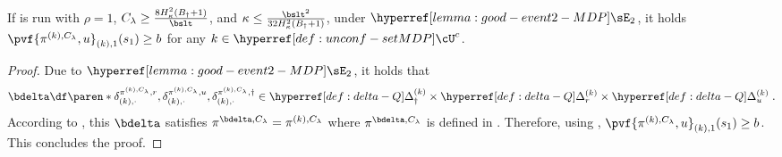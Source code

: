 \begin{lemma}
If  is run with $\rho = 1$, $C_\lambda \geq \frac{8H_\kappa^2 (B_\dagger + 1)}{\bslt}$, and $\kappa \leq \frac{\bslt^2}{32H_\kappa^2 (B_\dagger + 1)}$,
under $\confevent$, 
it holds $\pvf{\pi^{(k), C_\lambda}, u}_{(k), 1}(s_1) \geq b$ for any $k \in \unconfMDP^c$.
\end{lemma}
\begin{proof}
Due to $\confevent$, it holds that
$$
\bdelta \df \paren*{\delta^{\pi^{(k), C_\lambda}, r}_{(k), \cdot},
\delta^{\pi^{(k), C_\lambda}, u}_{(k), \cdot}, 
\delta^{\pi^{(k), C_\lambda}, \dagger}_{(k), \cdot}} \in \Deltac \times \Deltar \times \Deltau\;.
$$
According to , this $\bdelta$ satisfies
$\pi^{\bdelta, C_\lambda} = \pi^{(k), C_\lambda}$ where $\pi^{\bdelta, C_\lambda}$ is defined in .
Therefore, using , 
$\pvf{\pi^{(k), C_\lambda}, u}_{(k), 1}(s_1) \geq b$.
This concludes the proof.
\end{proof}



